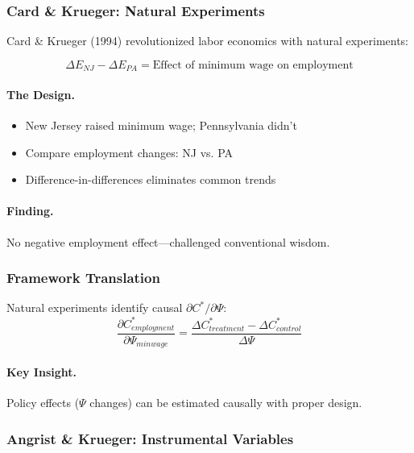 \subsubsection{Card \& Krueger: Natural Experiments}

Card \& Krueger (1994) revolutionized labor economics with natural experiments:

\begin{equation}
\boxed{
\Delta E_{NJ} - \Delta E_{PA} = \text{Effect of minimum wage on employment}
}
\label{eq:card-krueger}
\end{equation}

\paragraph{The Design.}
\begin{itemize}
    \item New Jersey raised minimum wage; Pennsylvania didn't
    \item Compare employment changes: NJ vs. PA
    \item Difference-in-differences eliminates common trends
\end{itemize}

\paragraph{Finding.}
No negative employment effect---challenged conventional wisdom.

\subsubsection{Framework Translation}

Natural experiments identify causal $\partial C^* / \partial \Psi$:
\begin{equation}
\frac{\partial C^*_{employment}}{\partial \Psi_{min wage}} = \frac{\Delta C^*_{treatment} - \Delta C^*_{control}}{\Delta \Psi}
\end{equation}

\paragraph{Key Insight.}
Policy effects ($\Psi$ changes) can be estimated causally with proper design.

\subsubsection{Angrist \& Krueger: Instrumental Variables}

